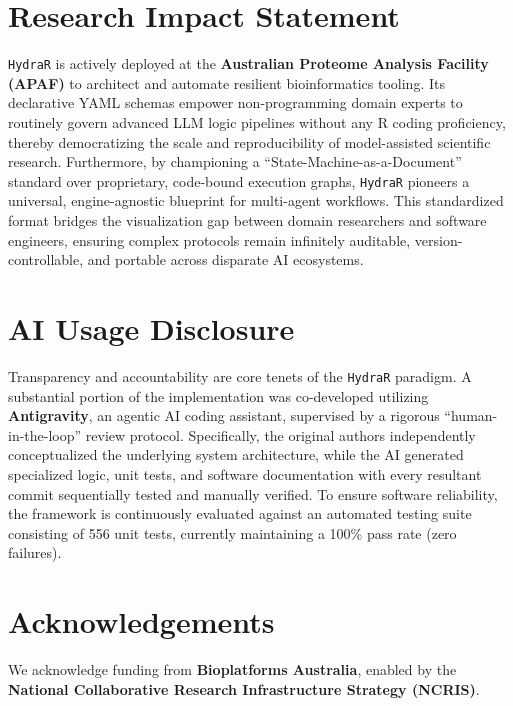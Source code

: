 \documentclass[
]{article}
\begin{document}
\section{Research Impact Statement}\label{research-impact-statement}

\texttt{HydraR} is actively deployed at the \textbf{Australian Proteome
Analysis Facility (APAF)} to architect and automate resilient
bioinformatics tooling. Its declarative YAML schemas empower
non-programming domain experts to routinely govern advanced LLM logic
pipelines without any R coding proficiency, thereby democratizing the
scale and reproducibility of model-assisted scientific research.
Furthermore, by championing a ``State-Machine-as-a-Document'' standard
over proprietary, code-bound execution graphs, \texttt{HydraR} pioneers
a universal, engine-agnostic blueprint for multi-agent workflows. This
standardized format bridges the visualization gap between domain researchers
and software engineers, ensuring complex protocols remain infinitely
auditable, version-controllable, and portable across disparate AI ecosystems.

\section{AI Usage Disclosure}\label{ai-usage-disclosure}

Transparency and accountability are core tenets of the \texttt{HydraR}
paradigm. A substantial portion of the implementation was co-developed
utilizing \textbf{Antigravity}, an agentic AI coding assistant,
supervised by a rigorous ``human-in-the-loop'' review protocol.
Specifically, the original authors independently conceptualized the
underlying system architecture, while the AI generated specialized
logic, unit tests, and software documentation with every resultant
commit sequentially tested and manually verified. To ensure software reliability, the framework is continuously evaluated against an automated testing suite consisting of 556 unit tests, currently maintaining a 100\% pass rate (zero failures).

\section{Acknowledgements}\label{acknowledgements}

We acknowledge funding from \textbf{Bioplatforms Australia}, enabled by
the \textbf{National Collaborative Research Infrastructure Strategy
(NCRIS)}.
\end{document}
